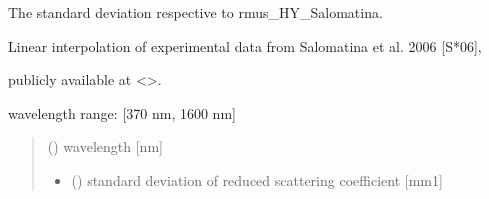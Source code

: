 \documentclass[letterpaper,10pt,english]{sphinxmanual}
\begin{document}
\begin{fulllineitems}
\label{\detokenize{04_scattering_coefficient:skinoptics.scattering_coefficient.std_rmus_HY_Salomatina}}
\pysigstartsignatures
{}
\pysigstopsignatures
\begin{DUlineblock}{0em}
\item[] The standard deviation respective to rmus\_HY\_Salomatina.
\item[] Linear interpolation of experimental data from Salomatina et al. 2006 {[}S*06{]},
\item[] publicly available at \textless{}\textgreater{}.
\end{DUlineblock}

\begin{DUlineblock}{0em}
\item[] wavelength range: {[}370 nm, 1600 nm{]}
\end{DUlineblock}
\begin{quote}\begin{description}
\sphinxAtStartPar
{} () \textendash{} wavelength {[}nm{]}

\sphinxAtStartPar
\begin{itemize}
\item {} 
\sphinxAtStartPar
{} () \textendash{} standard deviation of reduced scattering coefficient {[}mm\sphinxhyphen{}1{]}

\end{itemize}


\end{description}\end{quote}

\end{fulllineitems}


\sphinxstepscope
\end{document}
